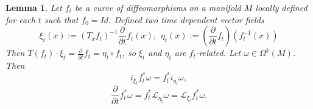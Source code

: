 \documentclass{article}
\newtheorem{lemma}[theorem]{Lemma} %
\theoremstyle{definition}
\begin{document}
\begin{lemma} \label{lemmaFlows}
    Let $f_t$ be a curve of diffeomorphisms on a manifold $M$ locally defined for each $t$ such that $f_0 = Id$. Defined two time dependent vector fields
    \begin{equation}
        \xi_t(x):=\left(T_x f_t\right)^{-1} \frac{\partial}{\partial t} f_t(x), \hspace{5pt} \eta_t(x):=\left(\frac{\partial}{\partial t} f_t\right)\left(f_t^{-1}(x)\right)
    \end{equation}
    Then $T\left(f_t\right) \cdot \xi_t=\frac{\partial}{\partial t} f_t=\eta_t \circ f_t$, so $\xi_t$ and $\eta_t$ are $f_t$-related. Let $\omega \in \Omega^k(M)$. Then
    \begin{equation}\label{eqFlows1}
        i_{\xi_t} f_t^* \omega=f_t^* i_{\eta_t} \omega, 
    \end{equation}
    \begin{equation}\label{eqFlows2}
        \frac{\partial}{\partial t} f_t^* \omega=f_t^* \mathcal{L}_{\eta_t} \omega=\mathcal{L}_{\xi_t} f_t^* \omega.
    \end{equation}
\end{lemma}
\end{document}
